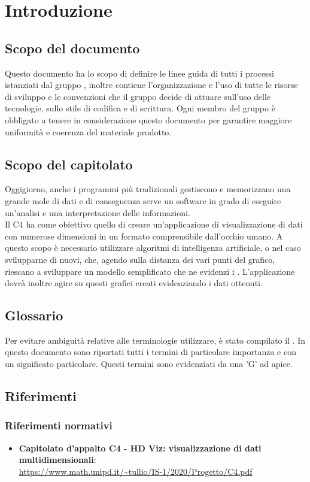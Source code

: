 \section{Introduzione}
\subsection{Scopo del documento}
Questo documento ha lo scopo di definire le linee guida di tutti i processi istanziati dal gruppo \Gruppo, inoltre contiene l'organizzazione e l'uso di tutte le risorse di sviluppo e le convenzioni che il gruppo decide di attuare sull'uso delle tecnologie, sullo stile di codifica e di scrittura. Ogni membro del gruppo è obbligato a tenere in considerazione questo documento per garantire maggiore uniformità e coerenza del materiale prodotto.

\subsection{Scopo del capitolato}
Oggigiorno, anche i programmi più tradizionali gestiscono e memorizzano una grande mole di dati e di conseguenza serve un software in grado di eseguire un'analisi e una interpretazione delle informazioni.\\
Il  C4 ha come obiettivo quello di creare un'applicazione di visualizzazione di dati con numerose dimensioni in un formato comprensibile dall'occhio umano.  A questo scopo è necessario utilizzare algoritmi di intelligenza artificiale, o nel caso svilupparne di nuovi, che, agendo sulla distanza dei vari punti del grafico, riescano a sviluppare un modello semplificato che ne evidenzi i . 
L'applicazione dovrà inoltre agire su questi grafici creati evidenziando i dati ottenuti.

\subsection{Glossario}
Per evitare ambiguità relative alle terminologie utilizzare, è stato compilato il . In questo documento sono riportati tutti i termini di particolare importanza e con un significato particolare. Questi termini sono evidenziati da una 'G' ad apice.

\subsection{Riferimenti}
\subsubsection{Riferimenti normativi}
\begin{itemize}	
	\item \textbf{Capitolato d'appalto C4 - HD Viz: visualizzazione di dati multidimensionali}:\\
	\textcolor{blue}{\url{https://www.math.unipd.it/~tullio/IS-1/2020/Progetto/C4.pdf}}
\end{itemize}

